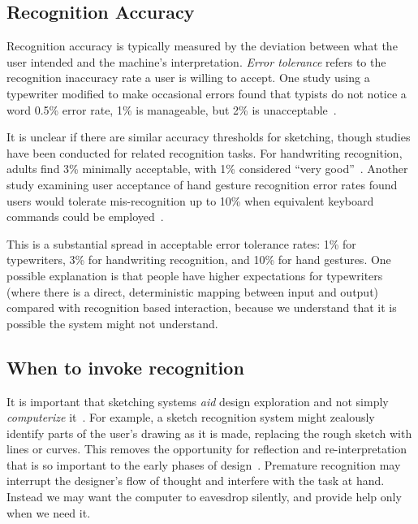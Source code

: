 \subsection{Recognition Accuracy}
\label{sec:recognition-accuracy}

Recognition accuracy is typically measured by the deviation between
what the user intended and the machine's interpretation. \textit{Error
  tolerance} refers to the recognition inaccuracy rate a user is
willing to accept. One study using a typewriter modified to make
occasional errors found that typists do not notice a word 0.5\% error
rate, 1\% is manageable, but 2\% is
unacceptable~\cite[p. 79]{cole-survey}. 

It is unclear if there are similar accuracy thresholds for sketching,
though studies have been conducted for related recognition tasks. For
handwriting recognition, adults find 3\% minimally acceptable, with
1\% considered ``very
good''~\cite{lalomia-recognition-accuracy}. Another study examining
user acceptance of hand gesture recognition error rates found users
would tolerate mis-recognition up to 10\% when equivalent keyboard
commands could be employed~\cite{karam-gesture-recognition}.

This is a substantial spread in acceptable error tolerance rates: 1\%
for typewriters, 3\% for handwriting recognition, and 10\% for hand
gestures. One possible explanation is that people have higher
expectations for typewriters (where there is a direct, deterministic
mapping between input and output) compared with recognition based
interaction, because we understand that it is possible the system
might not understand.

\subsection{When to invoke recognition}
\label{sec:recognition-when}

It is important that sketching systems \textit{aid} design exploration
and not simply \textit{computerize}
it~\cite{negroponte-soft-arc-mac}. For example, a sketch recognition
system might zealously identify parts of the user's drawing as it is
made, replacing the rough sketch with lines or curves. This removes
the opportunity for reflection and re-interpretation that is so
important to the early phases of
design~\cite{schon-reflective,goldschmidt-dialectics,terry-creative-ui}. Premature
recognition may interrupt the designer's flow of thought and interfere
with the task at hand. Instead we may want the computer to eavesdrop
silently, and provide help only when we need it.

